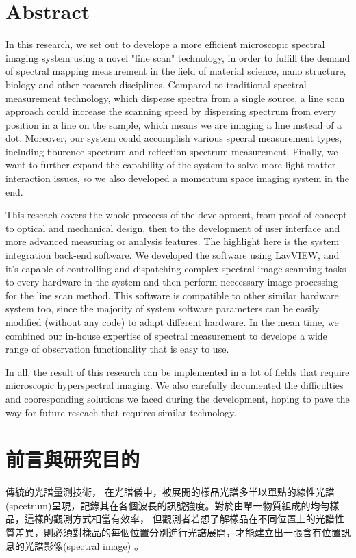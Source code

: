 \documentclass[12pt]{article}
\begin{document}
\section*{Abstract}
In this research, we set out to develope a more efficient microscopic spectral imaging system using a novel "line scan" technology, in order to fulfill the demand of spectral mapping measurement in the field of material science, nano structure, biology and other research disciplines. Compared to traditional spcetral measurement technology, which disperse spectra from a single source, a line scan approach could increase the scanning speed by dispersing spectrum from every position in a line on the sample, which means we are imaging a line instead of a dot. Moreover, our system could accomplish various specral measurement types, including flourence spectrum and reflection spectrum measurement. Finally, we want to further expand the capability of the system to solve more light-matter interaction issues, so we also developed a momentum space imaging system in the end.

This reseach covers the whole proccess of the development, from proof of concept to optical and mechanical design, then to the development of user interface and more advanced measuring or analysis features. The highlight here is the system integration back-end software. We developed the software using LavVIEW, and it's capable of controlling and dispatching complex spectral image scanning tasks to every hardware in the system and then perform neccessary image processing for the line scan method. This software is compatible to other similar hardware system too, since the majority of system software parameters can be easily modified (without any code) to adapt different hardware. In the mean time, we combined our in-house expertise of spectral measurement to develope a wide range of observation functionality that is easy to use.

In all, the result of this research can be implemented in a lot of fields that require microscopic hyperspectral imaging. We also carefully documented the difficulties and cooresponding solutions we faced during the development, hoping to pave the way for future reseach that requires similar technology.

\noindent \textbf{}
\newpage
\tableofcontents
\listoffigures
\listoftables
\newpage
{}
\section{前言與研究目的}
傳統的光譜量測技術，
在光譜儀中，被展開的樣品光譜多半以單點的線性光譜(spectrum)呈現，記錄其在各個波長的訊號強度。對於由單一物質組成的均勻樣品，這樣的觀測方式相當有效率，
但觀測者若想了解樣品在不同位置上的光譜性質差異，則必須對樣品的每個位置分別進行光譜展開，才能建立出一張含有位置訊息的光譜影像(spectral image)
。
\end{document}
